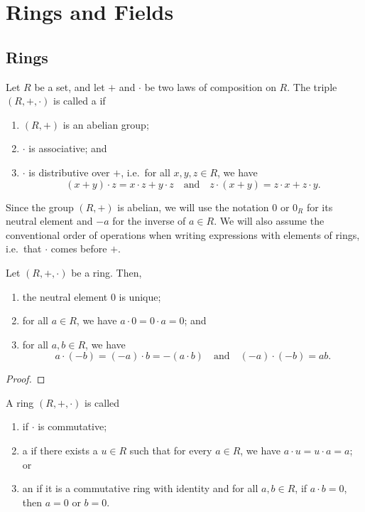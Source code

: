 \chapter{Rings and Fields}

\section{Rings}

\begin{defn}
Let $ R $ be a set, and let $ + $ and $ \cdot $ be two laws of composition on $ R $. The triple $ (R,+,\cdot) $ is called a  if
\begin{enumerate}
    \item $ (R,+) $ is an abelian group;
    \item $ \cdot $ is associative; and
    \item $ \cdot $ is distributive over $ + $, i.e.\ for all $ x,y,z\in R $, we have
    \begin{equation*}
        (x+y)\cdot z=x\cdot z+y\cdot z \quad\text{and}\quad z\cdot(x+y)=z\cdot x+z\cdot y.
    \end{equation*}
\end{enumerate}
\end{defn}

Since the group $ (R,+) $ is abelian, we will use the notation $ 0 $ or $ 0_R $ for its neutral element and $ -a $ for the inverse of $ a\in R $. We will also assume the conventional order of operations when writing expressions with elements of rings, i.e.\ that $ \cdot $ comes before $ + $.

\begin{prop}
Let $ (R,+,\cdot) $ be a ring. Then,
\begin{enumerate}
    \item the neutral element $ 0 $ is unique;
    \item for all $ a\in R $, we have $ a\cdot 0=0\cdot a=0 $; and
    \item for all $ a,b\in R $, we have
    \begin{equation*}
        a\cdot(-b)=(-a)\cdot b=-(a\cdot b) \quad\text{and}\quad (-a)\cdot(-b)=ab.
    \end{equation*}
\end{enumerate}
\end{prop}
\begin{proof}
\end{proof}

\begin{defn}\label{defn:ring_types}
A ring $ (R,+,\cdot) $ is called
\begin{enumerate}
    \item {} if $ \cdot $ is commutative;
    \item a  if there exists a $ u\in R $ such that for every $ a\in R $, we have $ a\cdot u=u\cdot a=a $; or
    \item an  if it is a commutative ring with identity and for all $ a,b\in R $, if $ a\cdot b=0 $, then $ a=0 $ or $ b=0 $.
\end{enumerate}
\end{defn}


